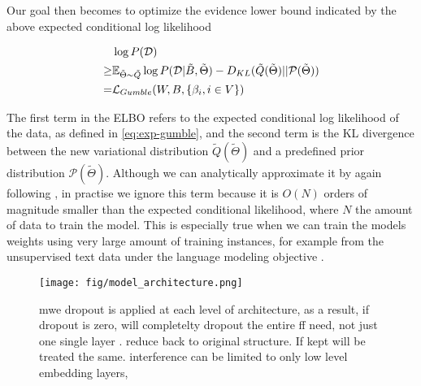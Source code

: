 Our goal then becomes to optimize the evidence lower bound indicated by the above expected conditional log likelihood 

\begin{align}
    &\log P( \mathcalD ) \nonumber\\
    \geq& \mathbb{E}_{\tilde{\Theta} \sim \tilde{Q} } \log P (\mathcalD | \tilde{B}, \tilde{\Theta})  - D_{KL} ( \tilde{Q} ( \tilde{\Theta}) ||\mathcal{P}( \tilde{\Theta} )) \nonumber\\
    = & \mathcal{L}_{Gumble} (W, B, \{\beta_i, i \in V\}) \label{eq:elbo0}
\end{align}

The first term in the ELBO refers to the expected conditional log likelihood of the data, as defined in \autoref{eq:exp-gumble}, and the second term is the KL divergence between the new variational distribution $\tilde{Q} ( \tilde{\Theta})$ 
and a predefined prior distribution  $\mathcal{P}( \tilde{\Theta})$.
Although we can analytically approximate it by again following \cite{gal2016uncertainty}, 
in practise we ignore this term because it is $O(N)$ orders of magnitude smaller than the expected conditional likelihood, where $N$ the amount of data to train the model. This is especially true when we can train the models weights using very large amount of training instances, for example from the unsupervised text data under the language modeling objective \cite{devlin2018bert}.





\begin{figure}[htb]
    \centering
    \texttt{[image: fig/model\_architecture.png]}
    \vspace{20pt}
    \caption{mwe dropout is applied at each level of architecture, as a result,
    if dropout is zero, will completelty dropout the entire ff need, not just one single layer
    . reduce back to original structure.  If kept will be treated the same.
    interference can be limited to only low level embedding layers, }
    \vspace{10pt}
    \label{fig:architecture-mwe-dropout}
\end{figure}






